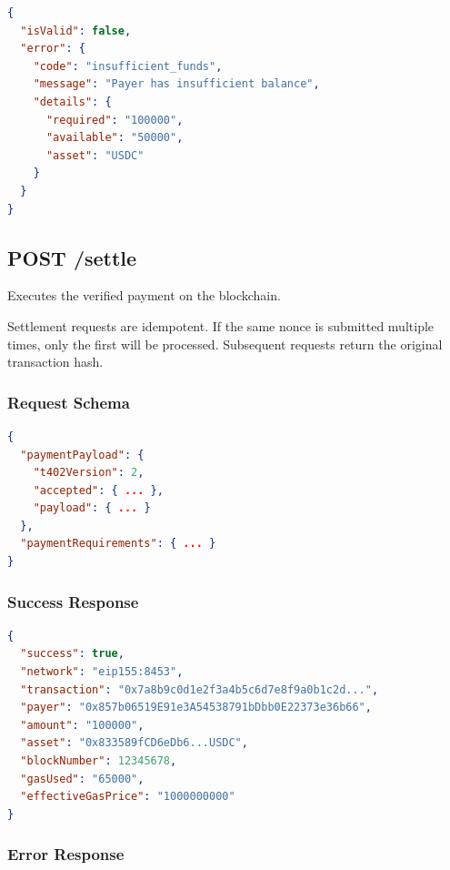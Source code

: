 \begin{lstlisting}[language=json,caption={/verify error response}]
{
  "isValid": false,
  "error": {
    "code": "insufficient_funds",
    "message": "Payer has insufficient balance",
    "details": {
      "required": "100000",
      "available": "50000",
      "asset": "USDC"
    }
  }
}
\end{lstlisting}

\subsection{POST /settle}
\label{subsec:settle-endpoint}

Executes the verified payment on the blockchain.

\begin{warningbox}[Idempotency]
Settlement requests are idempotent. If the same nonce is submitted multiple times, only the first will be processed. Subsequent requests return the original transaction hash.
\end{warningbox}

\subsubsection{Request Schema}

\begin{lstlisting}[language=json,caption={/settle request body}]
{
  "paymentPayload": {
    "t402Version": 2,
    "accepted": { ... },
    "payload": { ... }
  },
  "paymentRequirements": { ... }
}
\end{lstlisting}

\subsubsection{Success Response}

\begin{lstlisting}[language=json,caption={/settle success response}]
{
  "success": true,
  "network": "eip155:8453",
  "transaction": "0x7a8b9c0d1e2f3a4b5c6d7e8f9a0b1c2d...",
  "payer": "0x857b06519E91e3A54538791bDbb0E22373e36b66",
  "amount": "100000",
  "asset": "0x833589fCD6eDb6...USDC",
  "blockNumber": 12345678,
  "gasUsed": "65000",
  "effectiveGasPrice": "1000000000"
}
\end{lstlisting}

\subsubsection{Error Response}

